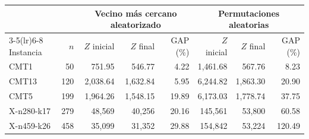 \begin{tabular}{lrrrrrrr}
\toprule
 & & \multicolumn{3}{c}{Vecino más cercano aleatorizado} & \multicolumn{3}{c}{Permutaciones aleatorias} \\
\cmidrule(lr){3-5}\cmidrule(lr){6-8}
Instancia & $n$ & $Z$ inicial & $Z$ final & GAP (\%) & $Z$ inicial & $Z$ final & GAP (\%) \\
\midrule
CMT1 & 50 & 751.95 & 546.77 & 4.22 & 1,461.68 & 567.76 & 8.23 \\
CMT13 & 120 & 2,038.64 & 1,632.84 & 5.95 & 6,244.82 & 1,863.30 & 20.90 \\
CMT5 & 199 & 1,964.26 & 1,548.15 & 19.89 & 6,173.03 & 1,778.74 & 37.75 \\
X-n280-k17 & 279 & 48,569 & 40,256 & 20.16 & 145,561 & 53,800 & 60.58 \\
X-n459-k26 & 458 & 35,099 & 31,352 & 29.88 & 154,842 & 53,224 & 120.49 \\
\bottomrule
\end{tabular}
